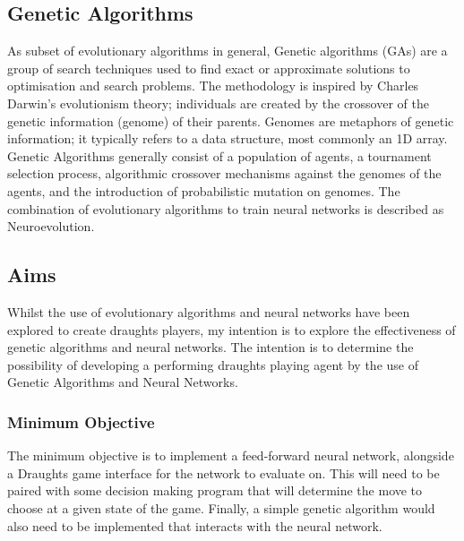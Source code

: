 \documentclass[12pt,a4paper]{article}
\begin{document}
 	\subsection*{Genetic Algorithms}

    As subset of evolutionary algorithms in general, Genetic algorithms (GAs) are a group of search techniques used to find exact or approximate solutions to optimisation and search problems. The methodology is inspired by Charles Darwin's evolutionism theory; individuals are created by the crossover of the genetic information (genome) of their parents. Genomes are metaphors of genetic information; it typically refers to a data structure, most commonly an 1D array. Genetic Algorithms generally consist of a population of agents, a tournament selection process, algorithmic crossover mechanisms against the genomes of the agents, and the introduction of probabilistic mutation on genomes. The combination of evolutionary algorithms to train neural networks is described as Neuroevolution.

    \subsection*{Aims}

    Whilst the use of evolutionary algorithms and neural networks have been explored to create draughts players, my intention is to explore the effectiveness of genetic algorithms and neural networks. The intention is to determine the possibility of developing a performing draughts playing agent by the use of Genetic Algorithms and Neural Networks.

    \subsubsection*{Minimum Objective}
        The minimum objective is to implement a feed-forward neural network, alongside a Draughts game interface for the network to evaluate on. This will need to be paired with some decision making program that will determine the move to choose at a given state of the game. Finally, a simple genetic algorithm would also need to be implemented that interacts with the neural network.
\end{document}

